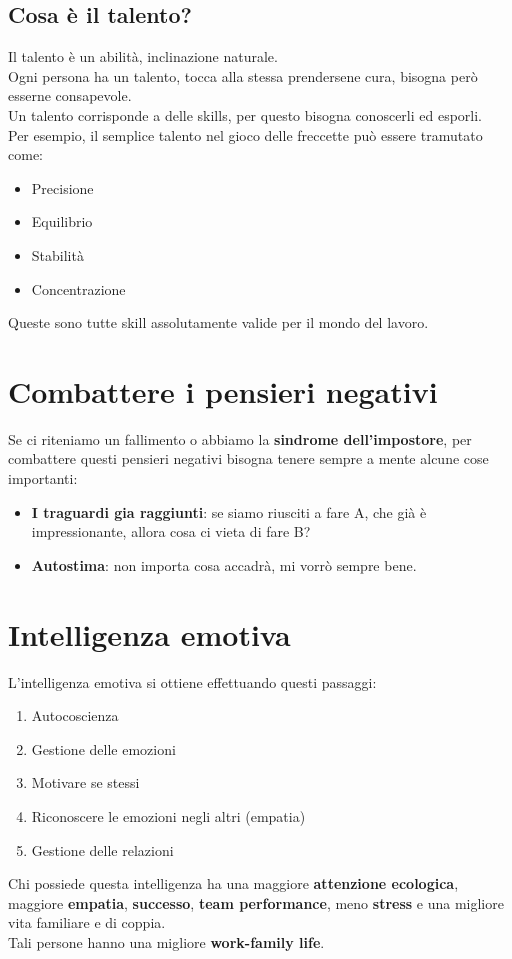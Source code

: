 \documentclass[12pt,a4paper]{article}
\let\oldsection\section
\renewcommand{\section}{\clearpage\oldsection}
\begin{document}
\subsection{Cosa è il talento?}
Il talento è un abilità, inclinazione naturale.\\
Ogni persona ha un talento, tocca alla stessa prendersene cura, bisogna però esserne consapevole.\\
Un talento corrisponde a delle skills, per questo bisogna conoscerli ed esporli.\\
Per esempio, il semplice talento nel gioco delle freccette può essere tramutato come:
\begin{itemize}
  \item Precisione
  \item Equilibrio
  \item Stabilità
  \item Concentrazione
\end{itemize}
Queste sono tutte skill assolutamente valide per il mondo del lavoro.

\section{Combattere i pensieri negativi}
Se ci riteniamo un fallimento o abbiamo la \textbf{sindrome dell'impostore}, per combattere questi pensieri negativi bisogna tenere sempre a mente alcune cose importanti:\
\begin{itemize}
  \item \textbf{I traguardi gia raggiunti}: se siamo riusciti a fare A, che già è impressionante, allora cosa ci vieta di fare B?
  \item \textbf{Autostima}: non importa cosa accadrà, mi vorrò sempre bene.
\end{itemize}

\section{Intelligenza emotiva}
L'intelligenza emotiva si ottiene effettuando questi passaggi:
\begin{enumerate}
  \item Autocoscienza
  \item Gestione delle emozioni
  \item Motivare se stessi
  \item Riconoscere le emozioni negli altri (empatia)
  \item Gestione delle relazioni
\end{enumerate}
Chi possiede questa intelligenza ha una maggiore \textbf{attenzione ecologica}, maggiore \textbf{empatia}, \textbf{successo}, \textbf{team performance}, meno \textbf{stress} e una migliore vita familiare e di coppia.\\
Tali persone hanno una migliore \textbf{work-family life}.
\end{document}
